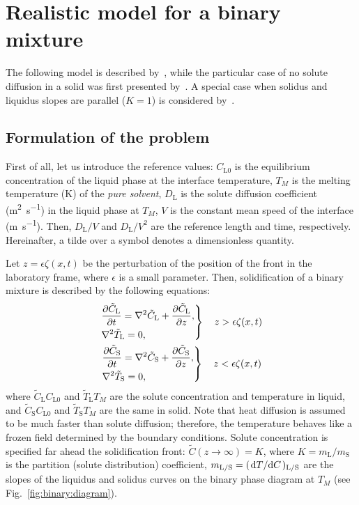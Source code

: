 \documentclass{article}
\newcommand{\liq}{\text{L}}
\newcommand{\sol}{\text{S}}
\begin{document}
\section{Realistic model for a binary mixture}

The following model is described by~\textcite{caroli1982emergence},
while the particular case of no solute diffusion in a solid was first presented by~\textcite{wollkind1970nonlinear}.
A special case when solidus and liquidus slopes are parallel ($K=1$) is considered by~\textcite{langer1977studies}.

\subsection{Formulation of the problem}

First of all, let us introduce the reference values:
$C_{\liq0}$ is the equilibrium concentration of the liquid phase at the interface temperature,
$T_M$ is the melting temperature (\si{\K}) of the \emph{pure solvent},
$D_\liq$ is the solute diffusion coefficient (\si{\m\squared\per\s}) in the liquid phase at $T_M$,
$V$ is the constant mean speed of the interface (\si{\m\per\s}).
Then, $D_\liq/V$ and $D_\liq/V^2$ are the reference length and time, respectively.
Hereinafter, a tilde over a symbol denotes a dimensionless quantity.

Let $z = \epsilon\zeta(x,t)$ be the perturbation of the position of the front in the laboratory frame,
where $\epsilon$ is a small parameter.
Then, solidification of a binary mixture is described by the following equations:
\begin{gather}
    \left.\begin{aligned}
        &\pdv{\tilde{C}_\liq}{t} = \nabla^2 \tilde{C}_\liq + \pdv{\tilde{C}_\liq}{z}, \\
        &\nabla^2 \tilde{T}_\liq = 0,
    \end{aligned}\right\} \quad z > \epsilon\zeta(x,t) \label{eq:governingL}\\
    \left.\begin{aligned}
        &\pdv{\tilde{C}_\sol}{t} = \nabla^2 \tilde{C}_\sol + \pdv{\tilde{C}_\sol}{z}, \\
        &\nabla^2 \tilde{T}_\sol = 0,
    \end{aligned}\right\} \quad z < \epsilon\zeta(x,t) \label{eq:governingS}
\end{gather}
where $\tilde{C}_\liq C_{\liq0}$ and $\tilde{T}_\liq T_M$ are the solute concentration and temperature in liquid,
and $\tilde{C}_\sol C_{\liq0}$ and $\tilde{T}_\sol T_M$ are the same in solid.
Note that heat diffusion is assumed to be much faster than solute diffusion;
therefore, the temperature behaves like a frozen field determined by the boundary conditions.
Solute concentration is specified far ahead the solidification front: $\tilde{C}(z\to\infty) = K$,
where $K = m_\liq/m_\sol$ is the partition (solute distribution) coefficient,
$m_{\liq/\sol} = (\dv*{T}{C})_{\liq/\sol}$ are the slopes of the liquidus and solidus curves
on the binary phase diagram at $T_M$ (see Fig.~\ref{fig:binary:diagram}).
\end{document}
